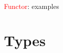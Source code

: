 \documentclass[pdf]{beamer}
\newcommand{\code}[1]{\textcolor{Red}{\textsf{#1}}}
\begin{document}
\begin{frame}{\code{Functor}: examples}
  \begin{figure}[H]
    \centering
    \hspace{0.2cm}
  \end{figure}
\end{frame}

\section{Types}
\label{sec:types}
\end{document}
